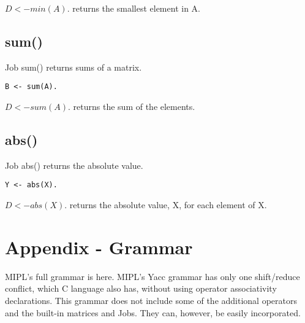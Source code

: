 \documentclass[prodmode,acmtecs]{acmsmall}
\begin{document}
$D <- min(A).$ returns the smallest element in A.
\medskip

\subsection{sum()}
Job sum() returns sums of a matrix.
\begin{lstlisting}
B <- sum(A).
\end{lstlisting}

$D <- sum(A).$ returns the sum of the elements.
\medskip

\subsection{abs()}
Job abs() returns the absolute value.
\begin{lstlisting}
Y <- abs(X).
\end{lstlisting}

$D <- abs(X).$ returns the absolute value, X, for each element of X.
\medskip

\bigskip
\bigskip
\bigskip
\bigskip

\section*{Appendix - Grammar}

MIPL's full grammar is here. MIPL's Yacc grammar has only one
shift/reduce conflict, which C language also has, without using
operator associativity declarations. This grammar does not 
include some of the additional operators and the built-in matrices
and Jobs. They can, however, be easily incorporated.


%
%




%
%



\medskip

\end{document}
